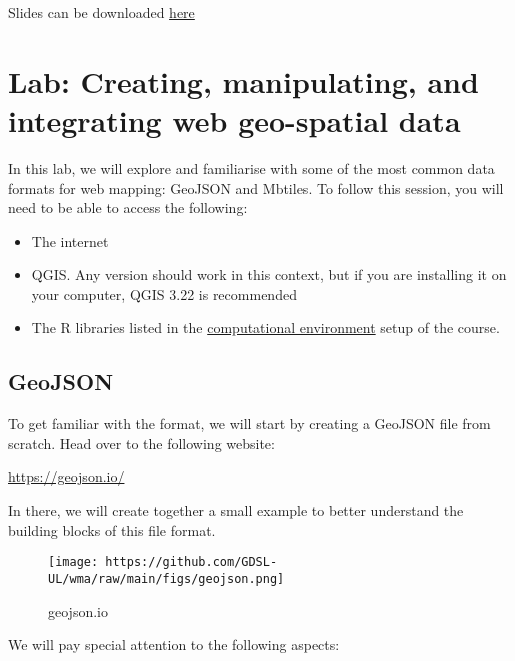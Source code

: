 \documentclass[
  letterpaper,
  DIV=11,
  numbers=noendperiod]{scrreprt}
\providecommand{\tightlist}{%
  \setlength{\itemsep}{0pt}\setlength{\parskip}{0pt}}\usepackage{longtable,booktabs,array}
\begin{document}
Slides can be downloaded
\href{https://github.com/GDSL-UL/wma/raw/main/pdf/lecture_03.pdf}{here}

\hypertarget{lab-creating-manipulating-and-integrating-web-geo-spatial-data}{%
\section{Lab: Creating, manipulating, and integrating web geo-spatial
data}\label{lab-creating-manipulating-and-integrating-web-geo-spatial-data}}

In this lab, we will explore and familiarise with some of the most
common data formats for web mapping: GeoJSON and Mbtiles. To follow this
session, you will need to be able to access the following:

\begin{itemize}
\tightlist
\item
  The internet
\item
  QGIS. Any version should work in this context, but if you are
  installing it on your computer, QGIS 3.22 is recommended
\item
  The R libraries listed in the
  \href{https://gdsl-ul.github.io/wma/overview.html\#computational-environment}{computational
  environment} setup of the course.
\end{itemize}

\hypertarget{geojson}{%
\subsection{GeoJSON}\label{geojson}}

To get familiar with the format, we will start by creating a GeoJSON
file from scratch. Head over to the following website:

\url{https://geojson.io/}

In there, we will create together a small example to better understand
the building blocks of this file format.

\begin{figure}

{\centering \texttt{[image: https://github.com/GDSL-UL/wma/raw/main/figs/geojson.png]}

}

\caption{geojson.io}

\end{figure}

We will pay special attention to the following aspects:
\end{document}
